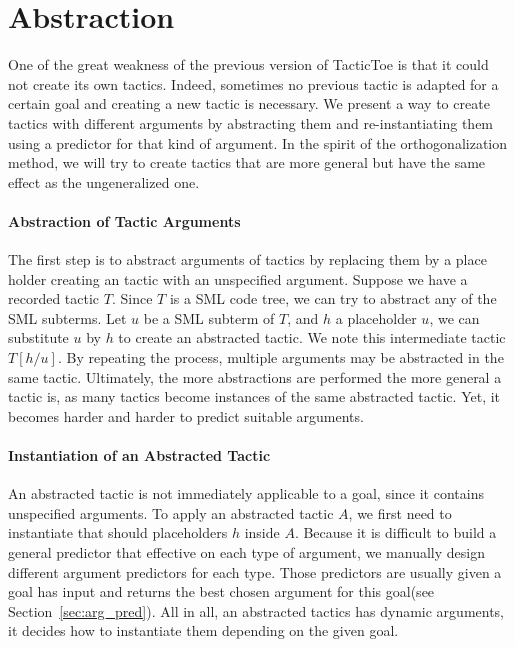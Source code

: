 \documentclass[runningheads,a4paper,draft]{svjour3}
\def\sml{\textsf{SML}\xspace}
\def\tactictoe{\textsf{TacticToe}\xspace}
\begin{document}
\section{Abstraction}\label{sec:synthesis}
One of the great weakness of the previous version of \tactictoe is that
it could not create its own tactics. Indeed, sometimes no previous tactic is 
adapted for a certain goal and creating a new tactic is necessary.
We present a way to create tactics with different arguments
by abstracting them and re-instantiating them using a predictor for that kind 
of argument. In the spirit of the orthogonalization method, we will try to 
create tactics that are more general but have the same effect as the 
ungeneralized one.



\paragraph{Abstraction of Tactic Arguments}
The first step is to abstract arguments of tactics by replacing them by a 
place holder creating an tactic with an unspecified argument.
Suppose we have a recorded tactic $T$. Since $T$ is a \sml code tree, we can 
try to abstract any of the 
\sml subterms. Let $u$ be a \sml subterm of $T$, and $h$ a placeholder $u$, we 
can substitute $u$ by $h$ to create an abstracted tactic.
We note this intermediate tactic $T[h/u]$. By repeating the process, multiple 
arguments may be abstracted in the same tactic. Ultimately, the more 
abstractions are performed the more general a tactic is, as many tactics 
become instances of the same abstracted tactic. Yet, it becomes harder and 
harder to predict suitable arguments. 

\paragraph{Instantiation of an Abstracted Tactic}
An abstracted tactic is not immediately applicable to a goal, since it contains
unspecified arguments. To apply an abstracted tactic $A$, we first need to 
instantiate that should placeholders $h$ inside $A$. Because it is difficult to 
build a general predictor that effective on each type of argument, we manually 
design different argument predictors for each type. Those predictors are 
usually given a goal has input and returns the best chosen argument for this 
goal(see Section~\ref{sec:arg_pred}). All in all, an abstracted tactics has 
dynamic arguments, it decides how to instantiate them depending on the given 
goal. 
\end{document}
